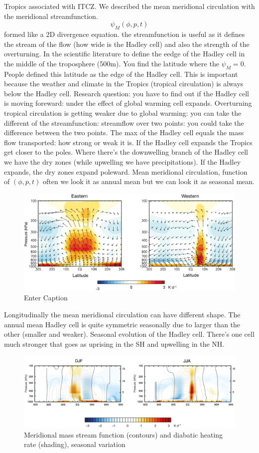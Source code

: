 Tropics associated with ITCZ. 
We described the mean meridional circulation with the meridional streamfunction. 
$$\psi_M(\phi,p,t)$$ formed like a 2D divergence equation. the streamfunction is useful as it defines the stream of the flow (how wide is the Hadley cell) and also the strength of the overturning. In the scientific literature to define the eedge of the Hadley cell in the middle of the troposphere (500m). You find the latitude where the $\psi_M=0$. People defined this latitude as the edge of the Hadley cell. This is important because the weather and climate in the Tropics (tropical circulation) is always below the Hadley cell. Research question: you have to find out if the Hadley cell is moving foreward: under the effect of global warming cell expands. Overturning tropical circulation is getting weaker due to global warming: you can take the different of the streamfunction: streamflow over two points: you could take the difference between the two points. The max of the Hadley cell equals the mass flow transported: how strong or weak it is. If the Hadley cell expands the Tropics get closer to the poles. Where there's the downwelling branch of the Hadley cell we have the dry zones (while upwelling we have precipitations). If the Hadley expands, the dry zones expand poleward. 
Mean meridional circulation, function of $(\phi,p,t)$ often we look it as annual mean but we can look it as seasonal mean. 
\begin{figure}
    \centering
    \includegraphics[width=0.5\linewidth]{uploads/winds.png}
    \caption{Enter Caption}
    \label{fig:enter-label}
\end{figure}
Longitudinally the mean meridional circulation can have different shape. The annual mean Hadley cell is quite symmetric seasonally due to larger than the other (smaller and weaker). Seasonal evolution of the Hadley cell. There's one cell much stronger that goes as uprising in the SH and upwelling in the NH. 
\begin{figure}[htpb]
    \centering
    \includegraphics[width=0.5\linewidth]{uploads/meridional stream.png}
    \caption{Meridional mass stream function (contours) and diabatic heating rate (shading), seasonal variation}
    \label{fig:mass}
\end{figure}

